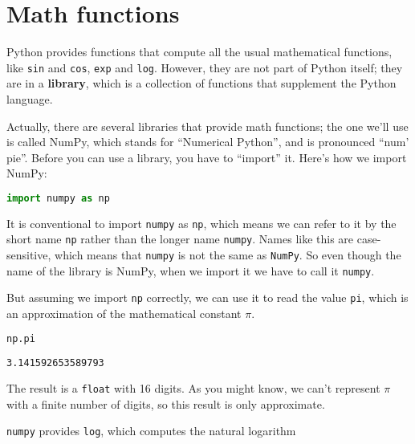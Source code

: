 \hypertarget{math-functions}{%
\section{Math functions}\label{math-functions}}

Python provides functions that compute all the usual mathematical
functions, like \passthrough{\lstinline!sin!} and
\passthrough{\lstinline!cos!}, \passthrough{\lstinline!exp!} and
\passthrough{\lstinline!log!}. However, they are not part of Python
itself; they are in a \textbf{library}, which is a collection of
functions that supplement the Python language.

Actually, there are several libraries that provide math functions; the
one we'll use is called NumPy, which stands for ``Numerical Python'',
and is pronounced ``num' pie''. Before you can use a library, you have
to ``import'' it. Here's how we import NumPy:

\begin{lstlisting}[language=Python]
import numpy as np
\end{lstlisting}

It is conventional to import \passthrough{\lstinline!numpy!} as
\passthrough{\lstinline!np!}, which means we can refer to it by the
short name \passthrough{\lstinline!np!} rather than the longer name
\passthrough{\lstinline!numpy!}. Names like this are case-sensitive,
which means that \passthrough{\lstinline!numpy!} is not the same as
\passthrough{\lstinline!NumPy!}. So even though the name of the library
is NumPy, when we import it we have to call it
\passthrough{\lstinline!numpy!}.

But assuming we import \passthrough{\lstinline!np!} correctly, we can
use it to read the value \passthrough{\lstinline!pi!}, which is an
approximation of the mathematical constant \(\pi\).

\begin{lstlisting}[language=Python]
np.pi
\end{lstlisting}

\begin{lstlisting}[]
3.141592653589793
\end{lstlisting}

The result is a \passthrough{\lstinline!float!} with 16 digits. As you
might know, we can't represent \(\pi\) with a finite number of digits,
so this result is only approximate.

\passthrough{\lstinline!numpy!} provides \passthrough{\lstinline!log!},
which computes the natural logarithm

